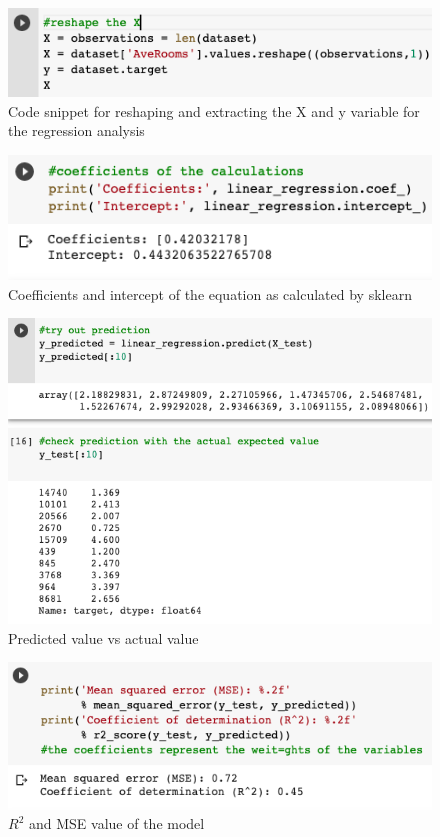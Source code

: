 \documentclass[conference]{IEEEtran}
\begin{document}
\begin{figure}[htbp]
	\includegraphics [scale=0.5]{figures/reshape_dataset.png}
	\caption{Code snippet for reshaping and extracting the X and y variable for the regression analysis}
	\label{fig:reshape_dataset}
\end{figure}

\begin{figure}[htbp]
	\includegraphics [scale=0.5]{figures/coefficients_intercepts.png}
	\caption{Coefficients and intercept of the equation as calculated by sklearn}
	\label{fig:coefficients_intercepts}
\end{figure}


\begin{figure}[htbp]
	\includegraphics [scale=0.5]{figures/predicted_vs_actual.png}
	\caption{Predicted value vs actual value}
	\label{fig:predicted_vs_actual}
\end{figure}


\begin{figure}[htbp]
	\includegraphics [scale=0.5]{figures/r_mse_value.png}
	\caption{$R^2$ and MSE value of the model}
	\label{fig:r_mse_value}
\end{figure}
\end{document}
